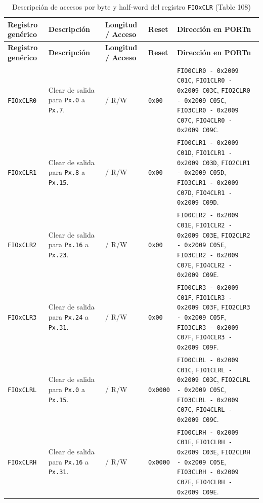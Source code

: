 \begin{longtable}{|>{\raggedright\arraybackslash}p{}|>{\raggedright\arraybackslash}p{}|>{\centering\arraybackslash}p{}|>{\centering\arraybackslash}p{}|>{\raggedright\arraybackslash}p{}|}
\caption{Descripción de accesos por byte y half-word del registro \texttt{FIOxCLR} (Table 108)} \\
\hline
\textbf{Registro genérico} & \textbf{Descripción} & \textbf{Longitud / Acceso} & \textbf{Reset} & \textbf{Dirección en PORTn} \\
\hline
\endfirsthead
\hline
\textbf{Registro genérico} & \textbf{Descripción} & \textbf{Longitud / Acceso} & \textbf{Reset} & \textbf{Dirección en PORTn} \\
\hline
\endhead
\texttt{FIOxCLR0} & Clear de salida para \texttt{Px.0} a \texttt{Px.7}. & 8 / R/W & \texttt{0x00} & \texttt{FIO0CLR0 - 0x2009 C01C}, \texttt{FIO1CLR0 - 0x2009 C03C}, \texttt{FIO2CLR0 - 0x2009 C05C}, \texttt{FIO3CLR0 - 0x2009 C07C}, \texttt{FIO4CLR0 - 0x2009 C09C}. \\
\hline
\texttt{FIOxCLR1} & Clear de salida para \texttt{Px.8} a \texttt{Px.15}. & 8 / R/W & \texttt{0x00} & \texttt{FIO0CLR1 - 0x2009 C01D}, \texttt{FIO1CLR1 - 0x2009 C03D}, \texttt{FIO2CLR1 - 0x2009 C05D}, \texttt{FIO3CLR1 - 0x2009 C07D}, \texttt{FIO4CLR1 - 0x2009 C09D}. \\
\hline
\texttt{FIOxCLR2} & Clear de salida para \texttt{Px.16} a \texttt{Px.23}. & 8 / R/W & \texttt{0x00} & \texttt{FIO0CLR2 - 0x2009 C01E}, \texttt{FIO1CLR2 - 0x2009 C03E}, \texttt{FIO2CLR2 - 0x2009 C05E}, \texttt{FIO3CLR2 - 0x2009 C07E}, \texttt{FIO4CLR2 - 0x2009 C09E}. \\
\hline
\texttt{FIOxCLR3} & Clear de salida para \texttt{Px.24} a \texttt{Px.31}. & 8 / R/W & \texttt{0x00} & \texttt{FIO0CLR3 - 0x2009 C01F}, \texttt{FIO1CLR3 - 0x2009 C03F}, \texttt{FIO2CLR3 - 0x2009 C05F}, \texttt{FIO3CLR3 - 0x2009 C07F}, \texttt{FIO4CLR3 - 0x2009 C09F}. \\
\hline
\texttt{FIOxCLRL} & Clear de salida para \texttt{Px.0} a \texttt{Px.15}. & 16 / R/W & \texttt{0x0000} & \texttt{FIO0CLRL - 0x2009 C01C}, \texttt{FIO1CLRL - 0x2009 C03C}, \texttt{FIO2CLRL - 0x2009 C05C}, \texttt{FIO3CLRL - 0x2009 C07C}, \texttt{FIO4CLRL - 0x2009 C09C}. \\
\hline
\texttt{FIOxCLRH} & Clear de salida para \texttt{Px.16} a \texttt{Px.31}. & 16 / R/W & \texttt{0x0000} & \texttt{FIO0CLRH - 0x2009 C01E}, \texttt{FIO1CLRH - 0x2009 C03E}, \texttt{FIO2CLRH - 0x2009 C05E}, \texttt{FIO3CLRH - 0x2009 C07E}, \texttt{FIO4CLRH - 0x2009 C09E}. \\
\hline
\end{longtable}

